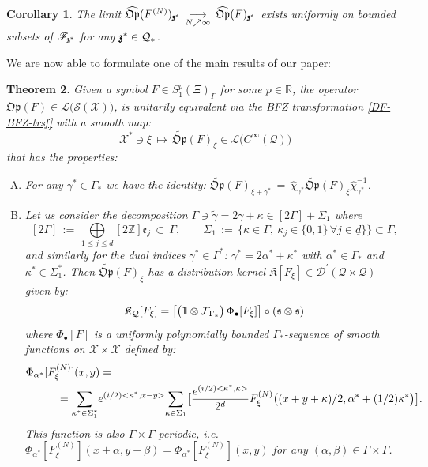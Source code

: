 \documentclass[12pt]{article}
\newtheorem{theorem}{Theorem}[section]
\newtheorem{corollary}[theorem]{Corollary}
\theoremstyle{definition}
\def\e{\mathfrak{e}}
\def\R{\mathbb{R}}
\def\Z{\mathbb{Z}}
\def\Op{\mathfrak{Op}}
\def\X{\mathcal X}
\def\T{\mathcal{Q}}
\def\bb1{{\rm{1}\hspace{-3pt}\mathbf{l}}}
\def\s{\mathfrak{s}}
\def\bz{\mathfrak{z}\hspace*{-4pt}\mathfrak{z}}
\def\tgamma{\tilde{\gamma}}
\def\beq{\begin{equation}}
\def\eeq{\end{equation}}
\numberwithin{equation}{section}
\begin{document}
\begin{corollary}\label{C-II-10}
The limit $\widehat{\Op}(F^{(N)})_{\bz^*}\,\underset{N\nearrow\infty}{\longrightarrow}\,\widehat{\Op}(F)_{\bz^*}$ exists uniformly on bounded subsets of $\mathscr{F}_{\bz^*}$ for any $\bz^*\in\T_*$. 
\end{corollary}

We are now able to formulate one of the main results of our paper:
\begin{theorem}\label{T-main} 
Given a symbol $F\in{S}^p_1(\Xi)_{\Gamma}$ for some $p\in\R$, the operator $\Op(F)\in\mathcal{L}\big(\mathscr{S}(\X)\big)$, is unitarily equivalent via the BFZ transformation \eqref{DF-BFZ-trsf} with a smooth map:
\beq
\X^*\ni\xi\,\mapsto\,\widetilde{\Op}(F)_{\xi}\in\mathcal{L}\big(C^\infty(\T)\big)
\eeq
that has the properties:
\begin{enumerate}[A. ]
\item  For any $\gamma^*\in\Gamma_*$ we have the identity: $\widetilde{\Op}(F)_{\xi+\gamma^*}\,=\,\hat{\chi}_{\gamma^*}\widetilde{\Op}(F)_{\xi}\hat{\chi}_{\gamma^*}^{-1}$.
\item 
{Let us consider the decomposition $\Gamma\ni\tgamma=2\gamma+\kappa\in[2\Gamma]+\Sigma_1$ where
\beq\label{F-II-31}
[2\Gamma]\,:=\,\underset{1\leq j\leq d}{\bigoplus}[2\Z]\e_j\,\subset\,\Gamma,\qquad\Sigma_1\,:=\,\big\{\kappa\in\Gamma,\ \kappa_j\in\{0,1\}\,\forall{j}\in\underline{d}\}\big\}\subset\Gamma,
\eeq
and similarly for the dual indices $\gamma^*\in\Gamma^*$: 
$\gamma^*=2\alpha^*+\kappa^*$ with $\alpha^*\in\Gamma_*$ and $\kappa^*\in\Sigma_1^*$. Then 
$\widetilde{\Op}(F)_{\xi}$} has a distribution kernel $\mathfrak{K}[F_\xi]\in\mathscr{D}^\prime(\T\times\T)$ given by: 
\beq
\mathfrak{K}_\T[F_\xi]=\big[\big(\bb1\otimes\mathcal{F}_{\Gamma_*}\big)\,\Phi_{\bullet}[F_{\xi}]\big]\circ(\s\otimes\s)
\eeq
where $\Phi_{\bullet}[F]$ is a uniformly polynomially bounded $\Gamma_*$-sequence of smooth functions on $\X\times\X$ defined by:
\begin{align}\label{F-53-2-St}
	&\Phi_{\alpha^*}[F^{(N)}_\xi](x,y)=\\ \nonumber
    &\hspace*{1cm}=\underset{\kappa^*\in\Sigma_1^*}{\sum}e^{(i/2)<\kappa^*,x-y>}\underset{\kappa\in\Sigma_1}{\sum}\big[\frac{e^{(i/2)<\kappa^*,\kappa>}}{2^d}F^{(N)}_\xi\big((x+y+\kappa)/2,\alpha^*+(1/2)\kappa^*\big)\big].
\end{align}
{This function is also} $\Gamma\times\Gamma$-periodic, i.e. $\Phi_{\alpha^*}[F^{(N)}_\xi](x+\alpha,y+\beta)=\Phi_{\alpha^*}[F^{(N)}_\xi](x,y)$ for any $(\alpha,\beta)\in\Gamma\times\Gamma$.

\end{enumerate}
\end{theorem}
\end{document}
